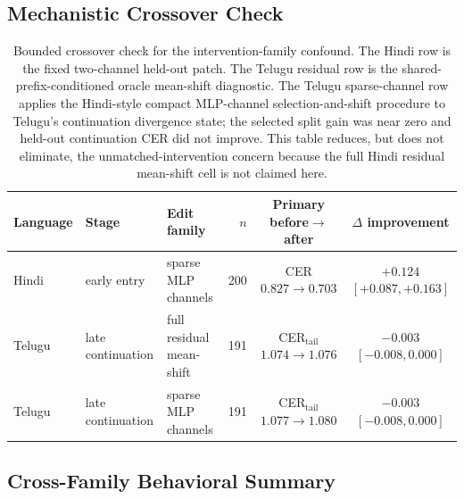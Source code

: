 \documentclass{article}
\begin{document}
\subsection{Mechanistic Crossover Check}\label{app:crossover}

\begin{table}[t]
\centering
\small
\setlength{\tabcolsep}{5pt}
\begin{tabular}{lllrcc}
\toprule
\textbf{Language} & \textbf{Stage} & \textbf{Edit family} & \textbf{$n$} & \textbf{Primary before$\to$after} & \textbf{$\Delta$ improvement} \\
\midrule
Hindi & early entry & sparse MLP channels & 200 & CER $0.827\to0.703$ & $+0.124$ $[+0.087,+0.163]$ \\
Telugu & late continuation & full residual mean-shift & 191 & CER$_{\mathrm{tail}}$ $1.074\to1.076$ & $-0.003$ $[-0.008,0.000]$ \\
Telugu & late continuation & sparse MLP channels & 191 & CER$_{\mathrm{tail}}$ $1.077\to1.080$ & $-0.003$ $[-0.008,0.000]$ \\
\bottomrule
\end{tabular}
\caption{Bounded crossover check for the intervention-family confound. The Hindi row is the fixed two-channel held-out patch. The Telugu residual row is the shared-prefix-conditioned oracle mean-shift diagnostic. The Telugu sparse-channel row applies the Hindi-style compact MLP-channel selection-and-shift procedure to Telugu's continuation divergence state; the selected split gain was near zero and held-out continuation CER did not improve. This table reduces, but does not eliminate, the unmatched-intervention concern because the full Hindi residual mean-shift cell is not claimed here.}
\label{tab:mechanistic_crossover}
\end{table}

\subsection{Cross-Family Behavioral Summary}\label{app:crossfamily}
\end{document}
